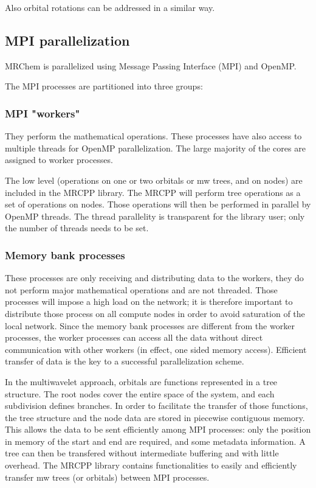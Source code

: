 \documentclass{article}
\begin{document}
Also orbital rotations can be addressed in a similar way.


\subsection{MPI parallelization}

MRChem is parallelized using Message Passing Interface (MPI) and OpenMP.  

The MPI processes are partitioned into three groups:

\subsubsection{MPI "workers"} 
They perform the mathematical operations. These processes have also access to multiple threads for OpenMP parallelization. The large majority of the cores are assigned to worker processes.

The low level (operations on one or two orbitals or mw trees, and on nodes) are included  in the MRCPP library. The MRCPP will perform tree operations as a set of operations on nodes. Those operations will then be performed in parallel by OpenMP threads. The thread parallelity is transparent for the library user; only the number of threads needs to be set.


\subsubsection{Memory bank processes} 
These processes are only receiving and distributing data to the workers, they do not perform major mathematical operations and are not threaded. Those processes will impose a high load on the network; it is therefore important to distribute those process on all compute nodes in order to avoid saturation of the local network. Since the memory bank processes are different from the worker processes, the worker processes can access all the data without direct communication with other workers (in effect, one sided memory access). Efficient transfer of data is the key to a successful parallelization scheme.

In the multiwavelet approach, orbitals are functions represented in a tree structure. The root nodes cover the entire space of the system, and each subdivision defines branches. In order to facilitate the transfer of those functions, the tree structure and the node data are stored in piecewise contiguous memory. This allows the data to be sent efficiently among MPI processes: only the position in memory of the start and end are required, and some metadata information. A tree can then be transfered without intermediate buffering and with little overhead. 
The MRCPP library contains functionalities to easily and efficiently transfer mw trees (or orbitals) between MPI processes. 
\end{document}
